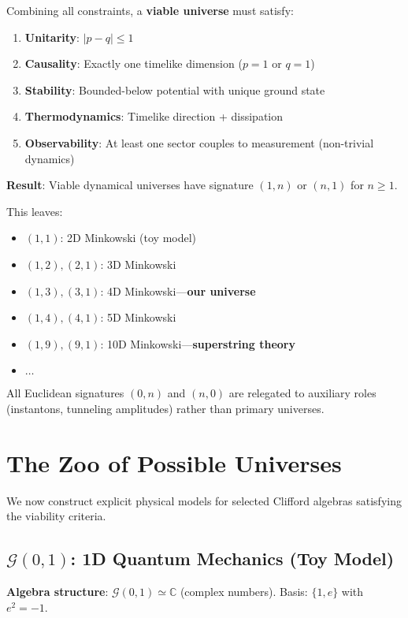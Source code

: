 \documentclass[11pt,a4paper]{article}
\numberwithin{equation}{section}
\theoremstyle{plain}
\theoremstyle{definition}
\theoremstyle{remark}
\newcommand{\C}{\mathbb{C}}
\newcommand{\Cl}{\mathcal{G}}               %
\begin{document}
Combining all constraints, a \textbf{viable universe} must satisfy:

\begin{enumerate}
\item \textbf{Unitarity}: $|p-q| \leq 1$
\item \textbf{Causality}: Exactly one timelike dimension ($p=1$ or $q=1$)
\item \textbf{Stability}: Bounded-below potential with unique ground state
\item \textbf{Thermodynamics}: Timelike direction + dissipation
\item \textbf{Observability}: At least one sector couples to measurement (non-trivial dynamics)
\end{enumerate}

\textbf{Result}: Viable dynamical universes have signature $(1,n)$ or $(n,1)$ for $n \geq 1$.

This leaves:
\begin{itemize}
\item $(1,1)$: 2D Minkowski (toy model)
\item $(1,2), (2,1)$: 3D Minkowski
\item $(1,3), (3,1)$: 4D Minkowski—\textbf{our universe}
\item $(1,4), (4,1)$: 5D Minkowski
\item $(1,9), (9,1)$: 10D Minkowski—\textbf{superstring theory}
\item $\ldots$
\end{itemize}

All Euclidean signatures $(0,n)$ and $(n,0)$ are relegated to auxiliary roles (instantons, tunneling amplitudes) rather than primary universes.

\section{The Zoo of Possible Universes}
\label{sec:zoo}

We now construct explicit physical models for selected Clifford algebras satisfying the viability criteria.

\subsection{$\Cl(0,1)$: 1D Quantum Mechanics (Toy Model)}
\label{sec:1d}

\textbf{Algebra structure}: $\Cl(0,1) \simeq \C$ (complex numbers). Basis: $\{1, e\}$ with $e^2 = -1$.
\end{document}
